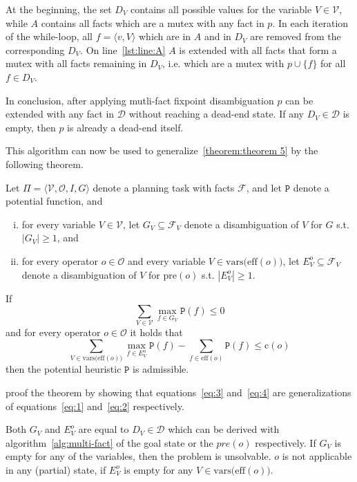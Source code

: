 At the beginning, the set $D_V$ contains all possible values for the variable $V\in\mathcal{V}$, while $A$ contains all facts which are a mutex with any fact in $p$.
In each iteration of the while-loop, all $f=\langle v, V\rangle$ which are in $A$ and in $D_V$ are removed from the corresponding $D_V$.
On line~\ref{lst:line:A} $A$ is extended with all facts that form a mutex with all facts remaining in $D_V$, i.e. which are a mutex with $p\cup\{f\}$ for all $f\in D_V$.

In conclusion, after applying mutli-fact fixpoint disambiguation $p$ can be extended with any fact in $\mathcal{D}$ without reaching a dead-end state.
If any $D_V\in\mathcal{D}$ is empty, then $p$ is already a dead-end itself.

This algorithm can now be used to generalize~\ref{theorem:theorem 5} by the following theorem.

\begin{theorem}
    \label{theorem:7}
    Let $\Pi = \langle \mathcal{V}, \mathcal{O}, I, G \rangle$ denote a planning task with facts $\mathcal{F}$, and let $\mathtt{P}$ denote a potential function, and
    \begin{enumerate}[(i)]
        \item for every variable $V\in\mathcal{V}$, let $G_V\subseteq\mathcal{F}_V$ denote a disambiguation of $V$ for $G$ s.t. $|G_V|\geq1$, and
        \item for every operator $o\in\mathcal{O}$ and every variable $V\in\mathrm{vars(eff}(o))$, let $E^o_V\subseteq\mathcal{F}_V $ denote a disambiguation of $V$ for $\mathrm{pre}(o)$ s.t. $|E^o_V|\geq1$.
    \end{enumerate}

    If
    \[\sum_{V\in\mathcal{V}}\max_{f\in G_V}\mathtt{P}(f)\leq0\label{eq:3}\tag{3}\]
    and for every operator $o\in\mathcal{O}$ it holds that
    \[\sum_{V\in\mathrm{vars(eff}(o))}\max_{f\in E^o_V}\mathtt{P}(f) - \sum_{f\in\mathrm{eff}(o)}\mathtt{P}(f)\leq\mathrm{c}(o)\label{eq:4}\tag{4}\]
    then the potential heuristic $\mathtt{P}$ is admissible.
\end{theorem}

\citeauthor{fivser2020strengthening} proof the theorem by showing that equations~\eqref{eq:3} and~\eqref{eq:4} are generalizations of equations~\eqref{eq:1} and~\eqref{eq:2} respectively.

Both $G_V$ and $E_V^o$ are equal to $D_V\in\mathcal{D}$ which can be derived with algorithm~\autoref{alg:multi-fact} of the goal state or the $pre(o)$ respectively.
If $G_V$ is empty for any of the variables, then the problem is unsolvable. 
$o$ is not applicable in any (partial) state, if $E^o_V$ is empty for any  $V\in\text{vars(eff}(o))$.

